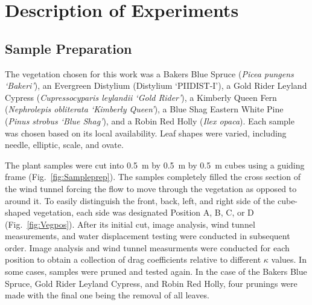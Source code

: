 \documentclass[12pt]{article}
\begin{document}
\section{Description of Experiments}
\label{sec:Experiments}


\subsection{Sample Preparation}
\label{ssec:SamplePrep}

The vegetation chosen for this work was a Bakers Blue Spruce ({\em Picea pungens `Bakeri'}), an Evergreen Distylium (Distylium `PIIDIST-I'), a Gold Rider Leyland Cypress ({\em Cupressocyparis leylandii `Gold Rider'}), a Kimberly Queen Fern ({\em Nephrolepis obliterata `Kimberly Queen'}), a Blue Shag Eastern White Pine ({\em Pinus strobus `Blue Shag'}), and a Robin Red Holly ({\em Ilex opaca}). Each sample was chosen based on its local availability. Leaf shapes were varied, including needle, elliptic, scale, and ovate.

The plant samples were cut into 0.5~\si{m} by 0.5~\si{m} by 0.5~\si{m} cubes using a guiding frame (Fig.~\ref{fig:Sampleprep}). The samples completely filled the cross section of the wind tunnel forcing the flow to move through the vegetation as opposed to around it. To easily distinguish the front, back, left, and right side of the cube-shaped vegetation, each side was designated Position A, B, C, or D (Fig.~\ref{fig:Vegpos}). After its initial cut, image analysis, wind tunnel measurements, and water displacement testing were conducted in subsequent order. Image analysis and wind tunnel measurments were conducted for each position to obtain a collection of drag coefficients relative to different $\kappa$ values. In some cases, samples were pruned and tested again. In the case of the Bakers Blue Spruce, Gold Rider Leyland Cypress, and Robin Red Holly, four prunings were made with the final one being the removal of all leaves.
\end{document}
